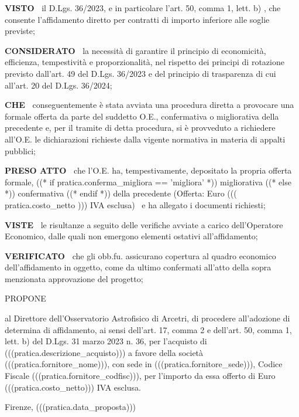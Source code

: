 \textbf{VISTO~}
il D.Lgs. 36/2023, e in particolare l'art. 50, comma 1, lett. b) , che
consente l'affidamento diretto per contratti di importo inferiore alle
soglie previste;


\textbf{CONSIDERATO~}
la necessità di garantire il principio di economicità, efficienza,
tempestività e proporzionalità, nel rispetto dei principi di rotazione
previsto dall'art. 49 del D.Lgs. 36/2023 e del principio di trasparenza
di cui all'art. 20 del D.Lgs. 36/2024;


\textbf{CHE~}
conseguentemente è stata avviata una procedura diretta a provocare una
formale offerta da parte del suddetto O.E., confermativa o migliorativa
della precedente e, per il tramite di detta procedura, si è provveduto
a richiedere all'O.E. le dichiarazioni richieste dalla vigente normativa
in materia di appalti pubblici;


\textbf{PRESO ATTO~}
che l'O.E. ha, tempestivamente, depositato la propria offerta formale,
((* if pratica.conferma_migliora == 'migliora' *)) migliorativa
((* else *)) confermativa ((* endif *))
della precedente (Offerta: Euro ((( pratica.costo_netto )))
IVA esclusa)  e ha allegato i documenti richiesti;


\textbf{VISTE~}
le risultanze a seguito delle verifiche avviate a carico dell'Operatore
Economico, dalle quali non emergono elementi ostativi all'affidamento;


\textbf{VERIFICATO~}
che gli obb.fu. assicurano copertura al quadro economico dell'affidamento
in oggetto, come da ultimo confermati all'atto della sopra menzionata
approvazione del progetto;  



\begin{center}
PROPONE
\end{center}

al Direttore dell'Osservatorio Astrofisico di Arcetri, di procedere
all'adozione di determina di affidamento, ai sensi dell'art. 17, comma
2 e dell'art. 50, comma 1, lett. b) del D.Lgs. 31 marzo 2023 n. 36, per
l'acquisto di (((pratica.descrizione_acquisto))) a favore della società
(((pratica.fornitore_nome))), con sede in (((pratica.fornitore_sede))),
Codice Fiscale (((pratica.fornitore_codfisc))), per l'importo da essa
offerto di Euro (((pratica.costo_netto))) IVA esclusa.


Firenze, (((pratica.data_proposta)))



